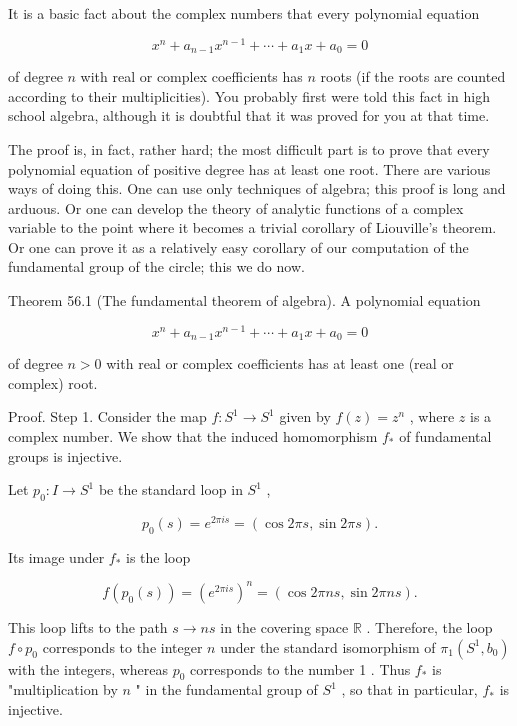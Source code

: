 \documentclass[10pt]{article}
\begin{document}
It is a basic fact about the complex numbers that every polynomial equation

\[
{x}^{n} + {a}_{n - 1}{x}^{n - 1} + \cdots  + {a}_{1}x + {a}_{0} = 0
\]

of degree \(n\) with real or complex coefficients has \(n\) roots (if the roots are counted according to their multiplicities). You probably first were told this fact in high school algebra, although it is doubtful that it was proved for you at that time.

The proof is, in fact, rather hard; the most difficult part is to prove that every polynomial equation of positive degree has at least one root. There are various ways of doing this. One can use only techniques of algebra; this proof is long and arduous. Or one can develop the theory of analytic functions of a complex variable to the point where it becomes a trivial corollary of Liouville's theorem. Or one can prove it as a relatively easy corollary of our computation of the fundamental group of the circle; this we do now.

Theorem 56.1 (The fundamental theorem of algebra). A polynomial equation

\[
{x}^{n} + {a}_{n - 1}{x}^{n - 1} + \cdots  + {a}_{1}x + {a}_{0} = 0
\]

of degree \(n > 0\) with real or complex coefficients has at least one (real or complex) root.

Proof. Step 1. Consider the map \(f : {S}^{1} \rightarrow  {S}^{1}\) given by \(f\left( z\right)  = {z}^{n}\) , where \(z\) is a complex number. We show that the induced homomorphism \({f}_{ * }\) of fundamental groups is injective.

Let \({p}_{0} : I \rightarrow  {S}^{1}\) be the standard loop in \({S}^{1}\) ,

\[
{p}_{0}\left( s\right)  = {e}^{2\pi is} = \left( {\cos {2\pi s},\sin {2\pi s}}\right) .
\]

Its image under \({f}_{ * }\) is the loop

\[
f\left( {{p}_{0}\left( s\right) }\right)  = {\left( {e}^{2\pi is}\right) }^{n} = \left( {\cos {2\pi ns},\sin {2\pi ns}}\right) .
\]

This loop lifts to the path \(s \rightarrow  {ns}\) in the covering space \(\mathbb{R}\) . Therefore, the loop \(f \circ  {p}_{0}\) corresponds to the integer \(n\) under the standard isomorphism of \({\pi }_{1}\left( {{S}^{1},{b}_{0}}\right)\) with the integers, whereas \({p}_{0}\) corresponds to the number 1 . Thus \({f}_{ * }\) is "multiplication by \(n\) " in the fundamental group of \({S}^{1}\) , so that in particular, \({f}_{ * }\) is injective.
\end{document}
